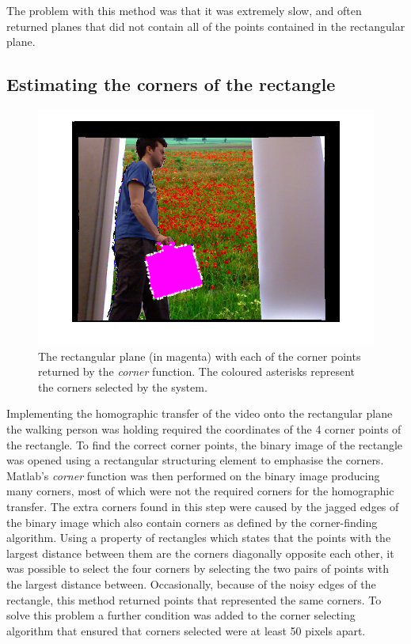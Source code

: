 \documentclass[11pt]{article}
\begin{document}
The problem with this method was that it was extremely slow, and often returned planes that did not contain all of the points contained in the rectangular plane.

\subsection{Estimating the corners of the rectangle}
\begin{figure}
\includegraphics[width=\textwidth]{corners}
\caption{The rectangular plane (in magenta) with each of the corner points returned by the \emph{corner} function. The coloured asterisks represent the corners selected by the system.}
\label{img_corners}
\end{figure}

Implementing the homographic transfer of the video onto the rectangular plane the walking person was holding required the coordinates of the 4 corner points of the rectangle. To find the correct corner points, the binary image of the rectangle was opened using a rectangular structuring element to emphasise the corners. Matlab's \emph{corner} function was then performed on the binary image producing many corners, most of which were not the required corners for the homographic transfer. The extra corners found in this step were caused by the jagged edges of the binary image which also contain corners as defined by the corner-finding algorithm. Using a property of rectangles which states that the points with the largest distance between them are the corners diagonally opposite each other, it was possible to select the four corners by selecting the two pairs of points with the largest distance between. Occasionally, because of the noisy edges of the rectangle, this method returned points that represented the same corners. To solve this problem a further condition was added to the corner selecting algorithm that ensured that corners selected were at least 50 pixels apart.
\end{document}
